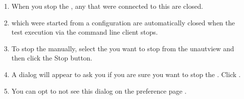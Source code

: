 \begin{enumerate}
\item When you stop the \gdagent{}, any \gdauts{} that were connected to this \gdagent{} are closed.
\item \gdauts{} which were started from a \app{} configuration are automatically closed when the test execution via the command line client stops.
\item To stop the \gdaut{} manually, select the \gdaut{} you want to stop from the \app{}unautview{} and then click the {Stop \gdaut{}} button. 
\item A dialog will appear to ask you if you are sure you want to stop the \gdaut{}. Click . 
\item You can opt to not see this dialog on the \app{} preference page . 
\end{enumerate}
